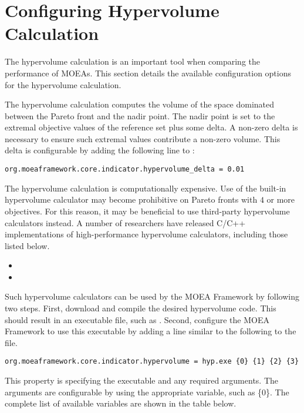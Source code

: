 \section{Configuring Hypervolume Calculation}
The hypervolume calculation is an important tool when comparing the performance of MOEAs.  This section details the available configuration options for the hypervolume calculation.

The hypervolume calculation computes the volume of the space dominated between the Pareto front and the nadir point.  The nadir point is set to the extremal objective values of the reference set plus some delta.  A non-zero delta is necessary to ensure such extremal values contribute a non-zero volume.  This delta is configurable by adding the following line to :

\begin{lstlisting}[language=Plaintext]
org.moeaframework.core.indicator.hypervolume_delta = 0.01
\end{lstlisting}

The hypervolume calculation is computationally expensive.  Use of the built-in hypervolume calculator may become prohibitive on Pareto fronts with $4$ or more objectives.  For this reason, it may be beneficial to use third-party hypervolume calculators instead.  A number of researchers have released C/C++ implementations of high-performance hypervolume calculators, including those listed below.

\begin{itemize}
  \item {}
  \item {}
\end{itemize}

Such hypervolume calculators can be used by the MOEA Framework by following two steps.  First, download and compile the desired hypervolume code.  This should result in an executable file, such as .  Second, configure the MOEA Framework to use this executable by adding a line similar to the following to the  file.

\begin{lstlisting}[language=Plaintext]
org.moeaframework.core.indicator.hypervolume = hyp.exe {0} {1} {2} {3}
\end{lstlisting}

This property is specifying the executable and any required arguments.  The arguments are configurable by using the appropriate variable, such as \{0\}.  The complete list of available variables are shown in the table below.

